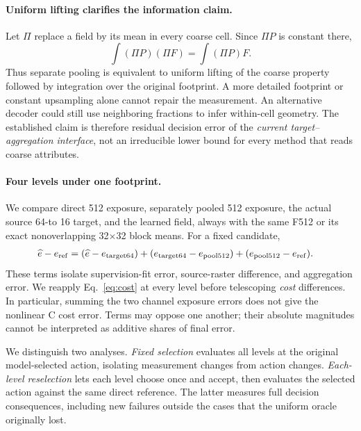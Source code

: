\documentclass{article}
\begin{document}
\paragraph{Uniform lifting clarifies the information claim.}
Let $\Pi $ replace a field by its mean in every coarse cell. Since $\Pi P$ is
constant there,
\begin{equation}
\int (\Pi P)(\Pi F)=\int (\Pi P)F.
\label{eq:lift}
\end{equation}
Thus separate pooling is equivalent to uniform lifting of the coarse property
followed by integration over the original footprint. A more detailed footprint
or constant upsampling alone cannot repair the measurement. An alternative
decoder could still use neighboring fractions to infer within-cell geometry.
The established claim is therefore residual decision error of the \emph{current
target--aggregation interface}, not an irreducible lower bound for every method
that reads coarse attributes.

\paragraph{Four levels under one footprint.}
We compare direct 512 exposure, separately pooled 512 exposure, the actual
source 64-to 16 target, and the learned field, always with the same F512 or its
exact nonoverlapping 32$\times $32 block means. For a fixed candidate,
\begin{align}
\widehat e-e_{\rm ref}
={}&(\widehat e-e_{\rm target 64})
 +(e_{\rm target 64}-e_{\rm pool 512})
 +(e_{\rm pool 512}-e_{\rm ref}).
\label{eq:telescope}
\end{align}
These terms isolate supervision-fit error, source-raster difference, and
aggregation error. We reapply Eq.~\ref{eq:cost} at every level before telescoping
\emph{cost} differences. In particular, summing the two channel exposure errors
does not give the nonlinear C cost error. Terms may oppose one another; their
absolute magnitudes cannot be interpreted as additive shares of final error.

We distinguish two analyses. \emph{Fixed selection} evaluates all levels at the
original model-selected action, isolating measurement changes from action
changes. \emph{Each-level reselection} lets each level choose once and accept,
then evaluates the selected action against the same direct reference. The latter
measures full decision consequences, including new failures outside the cases
that the uniform oracle originally lost.
\end{document}
